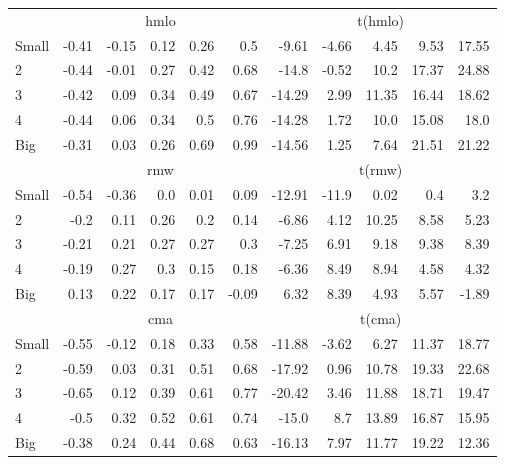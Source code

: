 \begin{table}[!ht]
\begin{tabular}{lrrrrrrrrrr}
  

      & \multicolumn{5}{c}{hmlo} & \multicolumn{5}{c}{t(hmlo)} \\
    \cmidrule(r){2-6} \cmidrule(r){7-11}
      Small  & -0.41  & -0.15  & 0.12  & 0.26  & 0.5   & -9.61  & -4.66  & 4.45  & 9.53  & 17.55  \\
          2  & -0.44  & -0.01  & 0.27  & 0.42  & 0.68   & -14.8  & -0.52  & 10.2  & 17.37  & 24.88  \\
          3  & -0.42  & 0.09  & 0.34  & 0.49  & 0.67   & -14.29  & 2.99  & 11.35  & 16.44  & 18.62  \\
          4  & -0.44  & 0.06  & 0.34  & 0.5  & 0.76   & -14.28  & 1.72  & 10.0  & 15.08  & 18.0  \\
      Big    & -0.31  & 0.03  & 0.26  & 0.69  & 0.99   & -14.56  & 1.25  & 7.64  & 21.51  & 21.22  \\

  

      & \multicolumn{5}{c}{rmw} & \multicolumn{5}{c}{t(rmw)} \\
    \cmidrule(r){2-6} \cmidrule(r){7-11}
      Small  & -0.54  & -0.36  & 0.0  & 0.01  & 0.09   & -12.91  & -11.9  & 0.02  & 0.4  & 3.2  \\
          2  & -0.2  & 0.11  & 0.26  & 0.2  & 0.14   & -6.86  & 4.12  & 10.25  & 8.58  & 5.23  \\
          3  & -0.21  & 0.21  & 0.27  & 0.27  & 0.3   & -7.25  & 6.91  & 9.18  & 9.38  & 8.39  \\
          4  & -0.19  & 0.27  & 0.3  & 0.15  & 0.18   & -6.36  & 8.49  & 8.94  & 4.58  & 4.32  \\
      Big    & 0.13  & 0.22  & 0.17  & 0.17  & -0.09   & 6.32  & 8.39  & 4.93  & 5.57  & -1.89  \\

  

      & \multicolumn{5}{c}{cma} & \multicolumn{5}{c}{t(cma)} \\
    \cmidrule(r){2-6} \cmidrule(r){7-11}
      Small  & -0.55  & -0.12  & 0.18  & 0.33  & 0.58   & -11.88  & -3.62  & 6.27  & 11.37  & 18.77  \\
          2  & -0.59  & 0.03  & 0.31  & 0.51  & 0.68   & -17.92  & 0.96  & 10.78  & 19.33  & 22.68  \\
          3  & -0.65  & 0.12  & 0.39  & 0.61  & 0.77   & -20.42  & 3.46  & 11.88  & 18.71  & 19.47  \\
          4  & -0.5  & 0.32  & 0.52  & 0.61  & 0.74   & -15.0  & 8.7  & 13.89  & 16.87  & 15.95  \\
      Big    & -0.38  & 0.24  & 0.44  & 0.68  & 0.63   & -16.13  & 7.97  & 11.77  & 19.22  & 12.36  \\

  

  \bottomrule
\end{tabular}
\label{tbl:25_Size_Value_FF2015_FF}
\end{table}